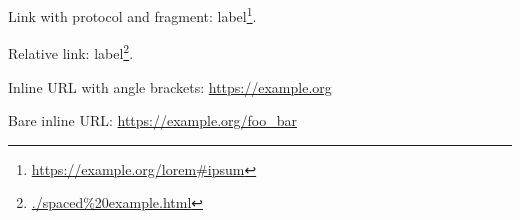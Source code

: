 Link with protocol and fragment: label\footnote{\url{https://example.org/lorem\#ipsum}}.

Relative link: label\footnote{\url{./spaced\%20example.html}}.

Inline URL with angle brackets: \url{https://example.org}

Bare inline URL: \url{https://example.org/foo\_bar}

